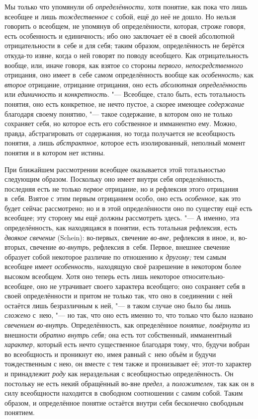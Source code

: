 Мы только что упомянули об {\em определённости,} хотя понятие, как пока что
лишь всеобщее и лишь {\em тождественное} с
собой, ещё до неё не дошло. Но нельзя говорить о всеобщем, не упомянув об
определённости, которая, строже говоря, есть особенность и единичность; ибо
оно заключает её в своей абсолютной отрицательности в~себе и для себя;
таким образом, определённость не берётся откуда-то извне, когда о ней
говорят по поводу всеобщего. Как отрицательность вообще, или, иначе говоря,
как взятое со стороны {\em первого, непосредственного} отрицания, оно
имеет в~себе самом определённость вообще как {\em особенность;} как
{\em второе} отрицание, отрицание отрицания, оно есть {\em абсолютная
определённость} или {\em единичность} и {\em конкретность}. "--- Всеобщее,
стало быть, есть тотальность понятия, оно есть
конкретное, не нечто пустое, а скорее имеющее {\em содержание}
благодаря своему понятию, "--- такое содержание,
в котором оно не только сохраняет себя, но которое есть его собственное и
имманентно ему. Можно, правда, абстрагировать от содержания, но тогда
получается не всеобщность понятия, а лишь {\em абстрактное,}
которое есть изолированный, неполный момент понятия и в котором нет истины.

При ближайшем рассмотрении всеобщее оказывается этой
тотальностью следующим образом. Поскольку оно имеет внутри себя
определённость, последняя есть не только {\em первое} отрицание,
но и рефлексия этого отрицания в~себя. Взятое с этим первым отрицанием
особо, оно есть {\em особенное,}
как это будет сейчас рассмотрено; но и в этой определённости
оно по существу ещё есть всеобщее; эту сторону мы ещё должны рассмотреть
здесь. "--- \label{bkm:bm23a}А именно, эта определённость, как
находящаяся в понятии, есть тотальная рефлексия, есть {\em двоякое свечение}
(Schein): во-первых, свечение {\em во-вне,} рефлексия в иное, и, во-вторых,
свечение {\em во-внутрь,} рефлексия в~себя. Первое, внешнее свечение образует
собой некоторое различие по отношению {\em к другому;} тем самым всеобщее имеет
{\em особенность,} находящую своё разрешение в некотором более высоком
всеобщем. Хотя оно теперь есть лишь некоторое относительно-всеобщее, оно не
утрачивает своего характера всеобщего; оно сохраняет себя в своей
определённости и притом не только так, что оно в соединении с ней остаётся
лишь безразличным к ней, "--- в таком случае оно было бы лишь {\em сложено}
с~нею, "--- но так, что оно есть именно то, что только что было названо
{\em свечением во-внутрь}. Определённость, как определённое {\em понятие,}
{\em повёрнута} из внешности {\em обратно внутрь себя;} она есть тот
собственный, имманентный {\em характер,} который есть нечто существенное
благодаря тому, что, будучи вобран во всеобщность и проникнут ею, имея равный
с~нею объём и будучи тождественным с нею, он вместе с тем также и пронизывает
её; этот-то характер и принадлежит {\em роду} как нераздельная с всеобщностью
определённость. Он постольку не есть некий обращённый во-вне {\em предел,}
а {\em положителен,} так как он в силу всеобщности находится в свободном
соотношении с самим собой. Таким образом, и определённое понятие остаётся
внутри себя бесконечно свободным понятием.

